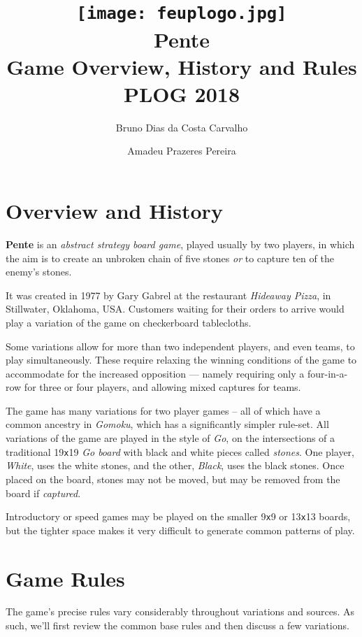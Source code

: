 \documentclass[12pt,a4paper,notitlepage]{article}
\title{
	\vspace{-2\baselineskip}
	\texttt{[image: feuplogo.jpg]}\\
	{\Huge Pente}\\
	{\Large Game Overview, History and Rules}\\
	{\normalsize PLOG 2018}
}
\author{
	Bruno Dias da Costa Carvalho\hspace*{1.5em}\text{up201606517}
	\and
	Amadeu Prazeres Pereira\hspace*{1.5em}\text{up201605646} 
}
\newcommand*{\boardsize}[1]{#1\texttt{x}#1}
\begin{document}
\maketitle
\thispagestyle{empty}

\section{Overview and History}

\textbf{Pente} is an \textit{abstract strategy board game}, played usually by two players, in which the aim is to create an unbroken chain of five stones \emph{or} to capture ten of the enemy's stones.

It was created in 1977 by Gary Gabrel at the restaurant \textsl{Hideaway Pizza}, in Stillwater, Oklahoma, USA.\supercite{pente-wikipedia}
Customers waiting for their orders to arrive would play a variation of the game on checkerboard tablecloths.\supercite{pente-wikipedia}

Some variations allow for more than two independent players, and even teams, to play simultaneously. These require relaxing the winning conditions of the game to accommodate for the increased opposition --- namely requiring only a four-in-a-row for three or four players, and allowing mixed captures for teams.\supercite{pente-winning-moves}

The game has many variations for two player games -- all of which have a common ancestry in \textit{Gomoku}, which has a significantly simpler rule-set.
All variations of the game are played in the style of \textit{Go}, on the intersections of a traditional \boardsize{19} \emph{Go board} with black and white pieces called \emph{stones}. One player, \textsl{White}, uses the white stones, and the other, \textsl{Black}, uses the black stones. Once placed on the board, stones may not be moved, but may be removed from the board if \emph{captured}.

Introductory or speed games may be played on the smaller \boardsize{9} or \boardsize{13} boards, but the tighter space makes it very difficult to generate common patterns of play.

\section{Game Rules}

The game's precise rules vary considerably throughout variations and sources. As such, we'll first review the common base rules and then discuss a few variations.
\end{document}
